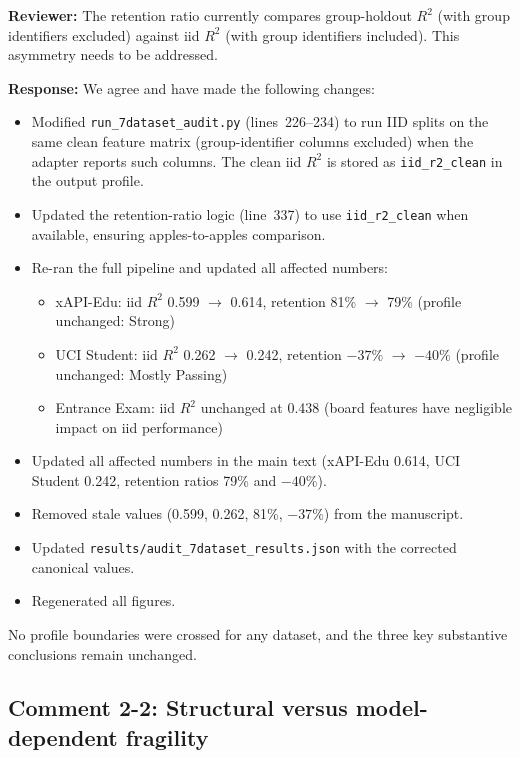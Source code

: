 \documentclass[10pt,letterpaper]{article}
\begin{document}
\textbf{Reviewer:} The retention ratio currently compares group-holdout $R^2$ (with group identifiers excluded) against iid $R^2$ (with group identifiers included). This asymmetry needs to be addressed.

\textbf{Response:} We agree and have made the following changes:

\begin{itemize}
  \item Modified \texttt{run\_7dataset\_audit.py} (lines~226--234) to run IID splits on the same clean feature matrix (group-identifier columns excluded) when the adapter reports such columns. The clean iid $R^2$ is stored as \texttt{iid\_r2\_clean} in the output profile.
  \item Updated the retention-ratio logic (line~337) to use \texttt{iid\_r2\_clean} when available, ensuring apples-to-apples comparison.
  \item Re-ran the full pipeline and updated all affected numbers:
    \begin{itemize}
      \item xAPI-Edu: iid $R^2$ 0.599 $\to$ 0.614, retention 81\% $\to$ 79\% (profile unchanged: Strong)
      \item UCI Student: iid $R^2$ 0.262 $\to$ 0.242, retention $-37\%$ $\to$ $-40\%$ (profile unchanged: Mostly Passing)
      \item Entrance Exam: iid $R^2$ unchanged at 0.438 (board features have negligible impact on iid performance)
    \end{itemize}
  \item Updated all affected numbers in the main text (xAPI-Edu 0.614, UCI Student 0.242, retention ratios 79\% and $-40\%$).
  \item Removed stale values (0.599, 0.262, 81\%, $-37\%$) from the manuscript.
  \item Updated \texttt{results/audit\_7dataset\_results.json} with the corrected canonical values.
  \item Regenerated all figures.
\end{itemize}

No profile boundaries were crossed for any dataset, and the three key substantive conclusions remain unchanged.

\subsection*{Comment 2-2: Structural versus model-dependent fragility}
\end{document}
